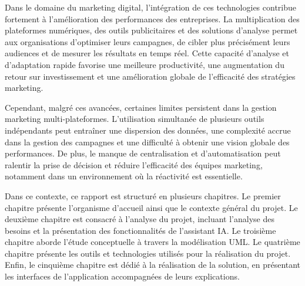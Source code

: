 \documentclass[12pt,a4paper]{report}
\numberwithin{figure}{chapter}
\numberwithin{table}{chapter}
\begin{document}
\vspace{0.3cm}

Dans le domaine du marketing digital, l'intégration de ces technologies contribue fortement à l'amélioration des performances des entreprises. La multiplication des plateformes numériques, des outils publicitaires et des solutions d'analyse permet aux organisations d'optimiser leurs campagnes, de cibler plus précisément leurs audiences et de mesurer les résultats en temps réel. Cette capacité d'analyse et d'adaptation rapide favorise une meilleure productivité, une augmentation du retour sur investissement et une amélioration globale de l'efficacité des stratégies marketing.

\vspace{0.3cm}

Cependant, malgré ces avancées, certaines limites persistent dans la gestion marketing multi-plateformes. L'utilisation simultanée de plusieurs outils indépendants peut entraîner une dispersion des données, une complexité accrue dans la gestion des campagnes et une difficulté à obtenir une vision globale des performances. De plus, le manque de centralisation et d'automatisation peut ralentir la prise de décision et réduire l'efficacité des équipes marketing, notamment dans un environnement où la réactivité est essentielle.

\vspace{0.3cm}


Dans ce contexte, ce rapport est structuré en plusieurs chapitres. Le premier chapitre présente l’organisme d’accueil ainsi que le contexte général du projet. Le deuxième chapitre est consacré à l’analyse du projet, incluant l’analyse des besoins et la présentation des fonctionnalités de l’assistant IA. Le troisième chapitre aborde l’étude conceptuelle à travers la modélisation UML. Le quatrième chapitre présente les outils et technologies utilisés pour la réalisation du projet. Enfin, le cinquième chapitre est dédié à la réalisation de la solution, en présentant les interfaces de l’application accompagnées de leurs explications.

\newpage





\end{document}

